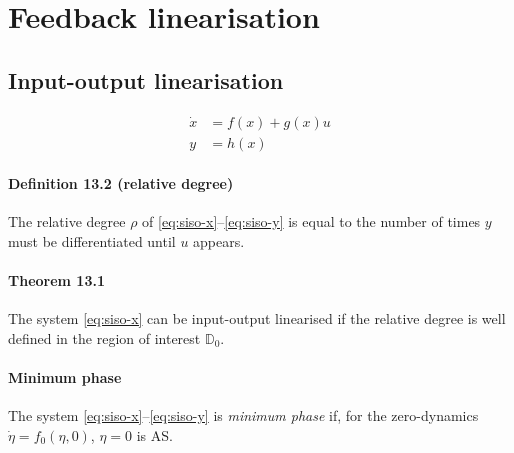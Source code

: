 \section{Feedback linearisation}

\subsection{Input-output linearisation}
\begin{align}
	\dot{x} &= f(x) + g(x)u \label{eq:siso-x} \\
	y       &= h(x)         \label{eq:siso-y}
\end{align}

\paragraph{Definition 13.2 (relative degree)}
The relative degree $\rho$ of \eqref{eq:siso-x}--\eqref{eq:siso-y} is equal to the number of times $y$ must be differentiated until $u$ appears.

\paragraph{Theorem 13.1}
The system \eqref{eq:siso-x} can be input-output linearised if the relative degree is well defined in the region of interest $\mathbb{D}_0$.

\paragraph{Minimum phase}
The system \eqref{eq:siso-x}--\eqref{eq:siso-y} is \emph{minimum phase} if, for the zero-dynamics $\dot{\eta} = f_0(\eta,0)$, $\eta = 0$ is AS.

